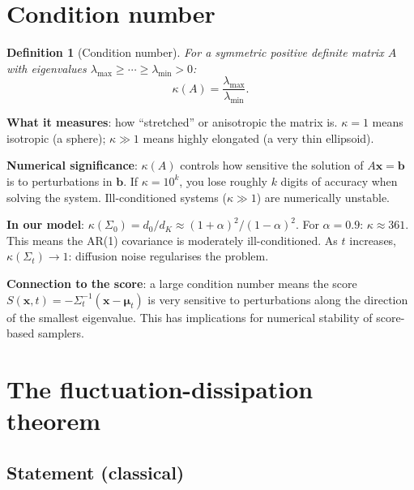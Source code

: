 \documentclass[11pt,a4paper]{article}
\newtheorem{definition}[theorem]{Definition}
\begin{document}
\section{Condition number}
\label{sec:q28}

\begin{definition}[Condition number]
For a symmetric positive definite matrix $A$ with eigenvalues $\lambda_{\max} \geq \cdots \geq \lambda_{\min} > 0$:
\begin{equation}
  \kappa(A) = \frac{\lambda_{\max}}{\lambda_{\min}}.
\end{equation}
\end{definition}

\textbf{What it measures}: how ``stretched'' or anisotropic the matrix is.  $\kappa = 1$ means isotropic (a sphere); $\kappa \gg 1$ means highly elongated (a very thin ellipsoid).

\textbf{Numerical significance}: $\kappa(A)$ controls how sensitive the solution of $A\mathbf{x} = \mathbf{b}$ is to perturbations in $\mathbf{b}$.  If $\kappa = 10^k$, you lose roughly $k$ digits of accuracy when solving the system.  Ill-conditioned systems ($\kappa \gg 1$) are numerically unstable.

\textbf{In our model}: $\kappa(\Sigma_0) = d_0/d_K \approx (1+\alpha)^2/(1-\alpha)^2$.  For $\alpha = 0.9$: $\kappa \approx 361$.  This means the AR(1) covariance is moderately ill-conditioned.  As $t$ increases, $\kappa(\Sigma_t) \to 1$: diffusion noise regularises the problem.

\textbf{Connection to the score}: a large condition number means the score $S(\mathbf{x},t) = -\Sigma_t^{-1}(\mathbf{x} - \bm{\mu}_t)$ is very sensitive to perturbations along the direction of the smallest eigenvalue.  This has implications for numerical stability of score-based samplers.


\section{The fluctuation-dissipation theorem}
\label{sec:q29}

\subsection{Statement (classical)}
\end{document}
